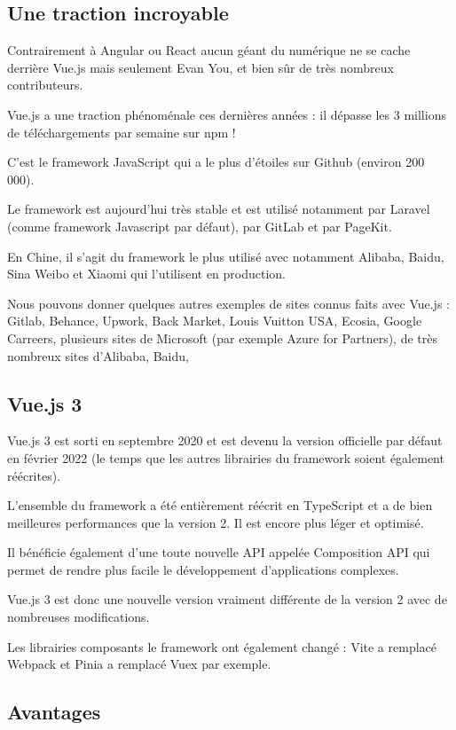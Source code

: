 \documentclass{article}
\begin{document}
\subsection{Une traction incroyable}
Contrairement à Angular ou React aucun géant du numérique ne se cache derrière Vue.js mais seulement Evan You, et bien sûr de très nombreux contributeurs.

Vue.js a une traction phénoménale ces dernières années : il dépasse les 3 millions de téléchargements par semaine sur npm !

C'est le framework JavaScript qui a le plus d'étoiles sur Github (environ 200 000).

Le framework est aujourd'hui très stable et est utilisé notamment par Laravel (comme framework Javascript par défaut), par GitLab et par PageKit.

En Chine, il s'agit du framework le plus utilisé avec notamment Alibaba, Baidu, Sina Weibo et Xiaomi qui l'utilisent en production.

Nous pouvons donner quelques autres exemples de sites connus faits avec Vue.js : Gitlab, Behance, Upwork, Back Market, Louis Vuitton USA, Ecosia, Google Carreers, plusieurs sites de Microsoft (par exemple Azure for Partners), de très nombreux sites d'Alibaba, Baidu,

\subsection{Vue.js 3}
Vue.js 3 est sorti en septembre 2020 et est devenu la version officielle par défaut en février 2022 (le temps que les autres librairies du framework soient également réécrites).

L'ensemble du framework a été entièrement réécrit en TypeScript et a de bien meilleures performances que la version 2. Il est encore plus léger et optimisé.

Il bénéficie également d'une toute nouvelle API appelée Composition API qui permet de rendre plus facile le développement d'applications complexes.

Vue.js 3 est donc une nouvelle version vraiment différente de la version 2 avec de nombreuses modifications.

Les librairies composants le framework ont également changé : Vite a remplacé Webpack et Pinia a remplacé Vuex par exemple.

\subsection{Avantages}
\end{document}
